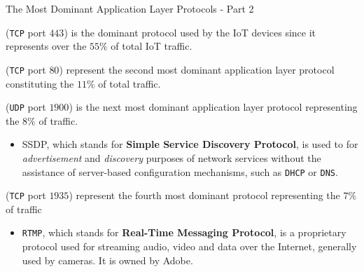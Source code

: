 \documentclass[10pt]{beamer}
\begin{document}
\begin{frame}{The Most Dominant Application Layer Protocols - Part 2}

\begin{description}
\justifying

\item[\texttt{HTTPS}] (\texttt{TCP} port $443$) is the dominant protocol used by the IoT devices since it represents over the $55\%$ of total IoT traffic.

\item[\texttt{HTTP}] (\texttt{TCP} port $80$) represent the second most dominant application layer protocol constituting the $11\%$ of total traffic.

\item[\texttt{SSDP}] (\texttt{UDP} port $1900$) is the next most dominant application layer protocol representing the $8\%$ of traffic.

\begin{itemize}
\item SSDP, which stands for \textbf{Simple Service Discovery Protocol}, is used to for \textit{advertisement} and \textit{discovery} purposes of network services without the assistance of server-based configuration mechanisms, such as \texttt{DHCP} or \texttt{DNS}.
\end{itemize}

\item[\texttt{RTMP}] (\texttt{TCP} port $1935$) represent the fourth most dominant protocol representing the $7\%$ of traffic

\begin{itemize}
\item \texttt{RTMP}, which stands for \textbf{Real-Time Messaging Protocol}, is a proprietary protocol used for streaming audio, video and data over the Internet, generally used by cameras. It is owned by Adobe.
\end{itemize}

\end{description}

\end{frame} 
\end{document}
